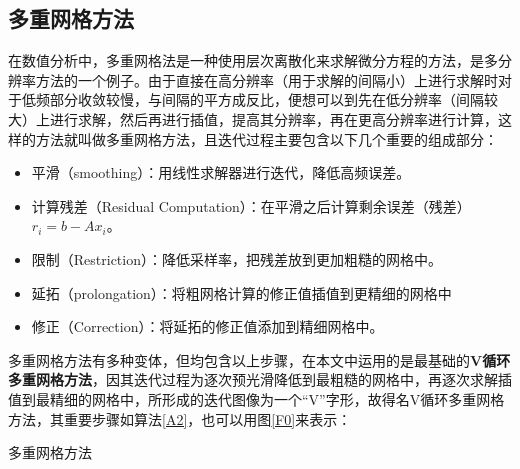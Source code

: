 \documentclass{article} %
\begin{document}
\subsection{多重网格方法}
在数值分析中，多重网格法是一种使用层次离散化来求解微分方程的方法，是多分辨率方法的一个例子。由于直接在高分辨率（用于求解的间隔小）上进行求解时对于低频部分收敛较慢，与间隔的平方成反比，便想可以到先在低分辨率（间隔较大）上进行求解，然后再进行插值，提高其分辨率，再在更高分辨率进行计算，这样的方法就叫做多重网格方法，且迭代过程主要包含以下几个重要的组成部分：
\begin{itemize}
    \item 平滑（smoothing）：用线性求解器进行迭代，降低高频误差。
    \item 计算残差（Residual Computation）：在平滑之后计算剩余误差（残差）$r_i=b-Ax_i$。
    \item 限制（Restriction）：降低采样率，把残差放到更加粗糙的网格中。
    \item 延拓（prolongation）：将粗网格计算的修正值插值到更精细的网格中
    \item 修正（Correction）：将延拓的修正值添加到精细网格中。
\end{itemize}

多重网格方法有多种变体，但均包含以上步骤，在本文中运用的是最基础的\textbf{V循环多重网格方法}，因其迭代过程为逐次预光滑降低到最粗糙的网格中，再逐次求解插值到最精细的网格中，所形成的迭代图像为一个“V”字形，故得名V循环多重网格方法，其重要步骤如算法\ref{A2}，也可以用图\ref{F0}来表示：
\begin{algorithm}
    \LinesNumbered
    \caption{多重网格方法}
    \label{A2}
\end{algorithm}
\end{document}
